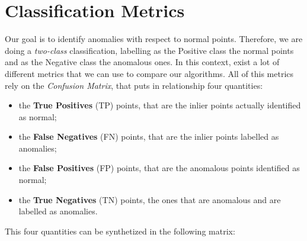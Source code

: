 \section{Classification Metrics}
Our goal is to identify anomalies with respect to normal points. Therefore, we are doing a \textit{two-class} classification, labelling as the Positive class the normal points and as the Negative class the anomalous ones. \newline
In this context, exist a lot of different metrics that we can use to compare our algorithms. All of this metrics rely on the \textit{Confusion Matrix}, that puts in relationship four quantities: 
\begin{itemize}
    \item the \textbf{True Positives} (TP) points, that are the inlier points actually identified as normal;
    \item the \textbf{False Negatives} (FN) points, that are the inlier points labelled as anomalies;
    \item the \textbf{False Positives} (FP) points, that are the anomalous points identified as normal;
    \item the \textbf{True Negatives} (TN) points, the ones that are anomalous and are labelled as anomalies.
\end{itemize}
This four quantities can be synthetized in the following matrix:
\begin{center}
\end{center}
